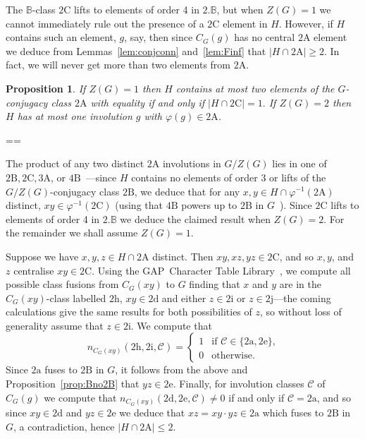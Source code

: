 \documentclass[11pt, a4paper]{amsart}
\makeatletter
\newcommand{\gap}{{\sf GAP}}
\newtheorem{prop}[thm]{Proposition}
\renewcommand{\proofname}{Proof}
\renewenvironment{proof}[1][\proofname]{\par
  \pushQED{\qed}  \normalfont \partopsep=\z@skip \topsep=\z@skip
  \trivlist
  \item[\hskip\labelsep
        \scshape
    #1\@addpunct{.}]\ignorespaces
}{  \popQED\endtrivlist\@endpefalse
}
\makeatother
\begin{document}
The $\mathbb{B}$-class $\mathrm{2C}$ lifts to elements of order 4 in $2.\mathbb{B}$, but when $Z(G)=1$ we cannot immediately rule out the presence of a $\mathrm{2C}$ element in $H$. However, if $H$ contains such an element, $g$, say, then since $C_G(g)$ has no central $\mathrm{2A}$ element we deduce from Lemmas~\ref{lem:conjconn} and~\ref{lem:Finf} that $|H\cap\mathrm{2A}|\geq 2$. In fact, we will never get more than two elements from $\mathrm{2A}$.
\begin{prop}\label{prop:B2C}
    If $Z(G)=1$ then $H$ contains at most two elements of the $G$-conjugacy class $\mathrm{2A}$ with equality if and only if $|H\cap\mathrm{2C}|=1.$ If $Z(G)=2$ then $H$ has at most one involution $g$ with $\varphi(g)\in\mathrm{2A}$.
\end{prop}
\begin{proof}
    The product of any two distinct $\mathrm{2A}$ involutions in $G/Z(G)$ lies in one of $\mathrm{2B},\mathrm{2C},\mathrm{3A}$, or $\mathrm{4B}$~\cite{atlas}---since $H$ contains no elements of order 3 or lifts of the $G/Z(G)$-conjugacy class $\mathrm{2B}$, we deduce that for any $x,y\in H\cap \varphi^{-1}(\mathrm{2A})$ distinct, $xy\in\varphi^{-1}(\mathrm{2C})$ (using that $\mathrm{4B}$ powers up to $\mathrm{2B}$ in $G$~\cite{atlas}). Since $\mathrm{2C}$ lifts to elements of order 4 in $2.\mathbb{B}$ we deduce the claimed result when $Z(G)=2$. For the remainder we shall assume $Z(G)=1$.

    Suppose we have $x,y,z\in H\cap \mathrm{2A}$ distinct. Then $xy,xz,yz\in\mathrm{2C}$, and so $x,y$, and $z$ centralise  $xy\in\mathrm{2C}$. Using the \gap~Character Table Library~\cite{CTblLib1.3.11}, we compute all possible class fusions from $C_G(xy)$ to $G$ finding that $x$ and $y$ are in the $C_G(xy)$-class labelled $\mathrm{2h}$, $xy\in\mathrm{2d}$ and either $z\in\mathrm{2i}$ or $z\in\mathrm{2j}$---the coming calculations give the same results for both possibilities of $z$, so without loss of generality assume that $z\in\mathrm{2i}$. We compute that $$n_{C_G(xy)}(\mathrm{2h},\mathrm{2i},\mathcal{C})=\begin{cases}
        1&\text{if $\mathcal{C}\in\{\mathrm{2a,2e}\}$,}\\
        0&\text{otherwise.} 
    \end{cases}$$
    Since $\mathrm{2a}$ fuses to $\mathrm{2B}$ in $G$, it follows from the above and Proposition~\ref{prop:Bno2B} that $yz\in\mathrm{2e}$. Finally, for involution classes $\mathcal{C}$ of $C_G(g)$ we compute that $n_{C_G(xy)}(\mathrm{2d},\mathrm{2e},\mathcal{C})\ne0$ if and only if $\mathcal{C}=\mathrm{2a}$, and so since $xy\in\mathrm{2d}$ and  $yz\in \mathrm{2e}$ we deduce that $xz=xy\cdot yz\in\mathrm{2a}$ which fuses to $\mathrm{2B}$ in $G$, a contradiction, hence $|H\cap 2\mathrm{A}|\leq 2$.


\end{proof}
\end{document}
